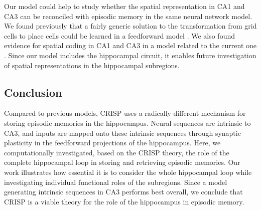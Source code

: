 \documentclass[utf8]{frontiersSCNS} %
\begin{document}
Our model could help to study whether the spatial representation in CA1 and CA3 can be reconciled with episodic memory in the same neural network model. We found previously that a fairly generic solution to the transformation from grid cells to place cells could be learned in a feedforward model \cite{cheng2011structure}. We also found evidence for spatial coding in CA1 and CA3 in a model related to the current one \cite{neher2015memory}. Since our model includes the hippocampal circuit, it enables future investigation of spatial representations in the hippocampal subregions. 


\subsection{Conclusion} 
Compared to previous models, CRISP uses a radically different mechanism for storing episodic memories in the hippocampus. Neural sequences are intrinsic to CA3, and inputs are mapped onto these intrinsic sequences through synaptic plasticity in the feedforward projections of the hippocampus. Here, we computationally investigated, based on the CRISP theory, the role of the complete hippocampal loop in storing and retrieving episodic memories. Our work illustrates how essential it is to consider the whole hippocampal loop while investigating individual functional roles of the subregions. Since a model generating intrinsic sequences in CA3 performs best overall, we conclude that CRISP is a viable theory for the role of the hippocampus in episodic memory.



\end{document}
